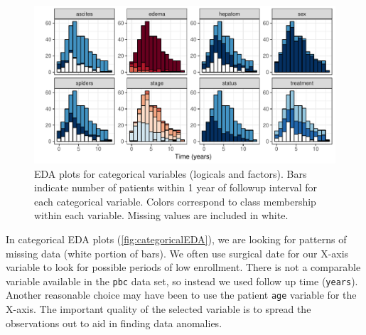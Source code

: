 \documentclass[article, nojss]{jss}
\begin{document}
\begin{Schunk}
\begin{figure}[!htb]

{\centering \includegraphics{rfs-categoricalEDA-1}

}

\caption[EDA plots for categorical variables (logicals and factors)]{EDA plots for categorical variables (logicals and factors). Bars indicate number of patients within 1 year of followup interval for each categorical variable. Colors correspond to class membership within each variable. Missing values are included in white.}\label{fig:categoricalEDA}
\end{figure}
\end{Schunk}

In categorical EDA plots (\autoref{fig:categoricalEDA}), we are looking
for patterns of missing data (white portion of bars). We often use
surgical date for our X-axis variable to look for possible periods of
low enrollment. There is not a comparable variable available in the
\texttt{pbc} data set, so instead we used follow up time
(\texttt{years}). Another reasonable choice may have been to use the
patient \texttt{age} variable for the X-axis. The important quality of
the selected variable is to spread the observations out to aid in
finding data anomalies.
\end{document}
